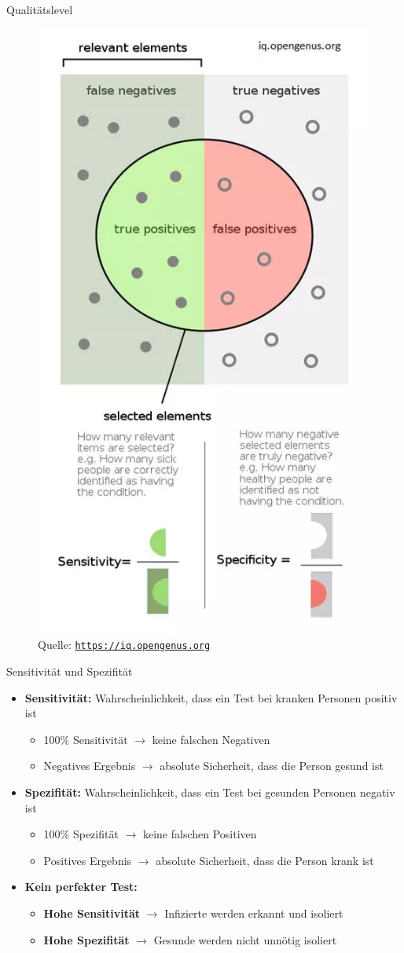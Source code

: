 \documentclass[ngerman,14pt,aspectratio=1610]{beamer}
\newcommand{\source}{}
\begin{document}
	\renewcommand{\source}{ }
	
	\begin{frame}[t]{Qualitätslevel}
		\begin{figure}[h]
			\centering
			\includegraphics[width=0.28\linewidth]{sensitivity-specificity}
			\tiny Quelle: \href{https://iq.opengenus.org/precision-recall-sensitivity-specificity/}{\texttt{https://iq.opengenus.org}}
		\end{figure}
	\end{frame}
	
	\renewcommand{\source}{Quelle: \url{https://arxiv.org/pdf/2210.13089}}
	
	\begin{frame}[t]{Sensitivität und Spezifität} \vspace{5pt}
		\begin{itemize}
			\item \textbf{\alert{Sensitivität:}} Wahrscheinlichkeit, dass ein Test bei kranken Personen positiv ist
			\begin{itemize}
				\item 100\% Sensitivität $\rightarrow$ keine falschen Negativen
				\item Negatives Ergebnis $\rightarrow$ absolute Sicherheit, dass die Person gesund ist
			\end{itemize}
			
			\item \textbf{\alert{Spezifität:}} Wahrscheinlichkeit, dass ein Test bei gesunden Personen negativ ist
			\begin{itemize}
				\item 100\% Spezifität $\rightarrow$ keine falschen Positiven
				\item Positives Ergebnis $\rightarrow$ absolute Sicherheit, dass die Person krank ist
			\end{itemize}
		
			\item \textbf{Kein perfekter Test:}
			\begin{itemize}
				\item \textbf{Hohe Sensitivität} $\rightarrow$ Infizierte werden erkannt und isoliert
				\item \textbf{Hohe Spezifität} $\rightarrow$ Gesunde werden nicht unnötig isoliert
			\end{itemize}
		\end{itemize}
	\end{frame}
	
\end{document}
